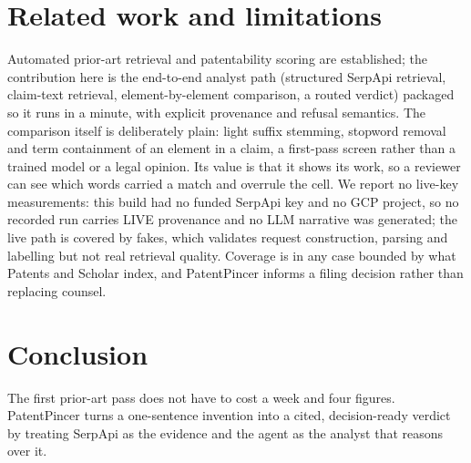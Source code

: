 \documentclass[12pt]{article}
\begin{document}
\section{Related work and limitations}
Automated prior-art retrieval and patentability scoring are established; the
contribution here is the end-to-end analyst path (structured SerpApi retrieval,
claim-text retrieval, element-by-element comparison, a routed verdict) packaged
so it runs in a minute, with explicit provenance and refusal semantics. The
comparison itself is deliberately plain: light suffix stemming, stopword removal
and term containment of an element in a claim, a first-pass screen rather than a
trained model or a legal opinion. Its value is that it shows its work, so a
reviewer can see which words carried a match and overrule the cell. We report no
live-key measurements: this build had no funded SerpApi key and no GCP project,
so no recorded run carries LIVE provenance and no LLM narrative was generated;
the live path is covered by fakes, which validates request construction, parsing
and labelling but not real retrieval quality. Coverage is in any case bounded by
what Patents and Scholar index, and PatentPincer informs a filing decision rather
than replacing counsel.

\section{Conclusion}
The first prior-art pass does not have to cost a week and four figures.
PatentPincer turns a one-sentence invention into a cited, decision-ready verdict
by treating SerpApi as the evidence and the agent as the analyst that reasons
over it.
\end{document}
